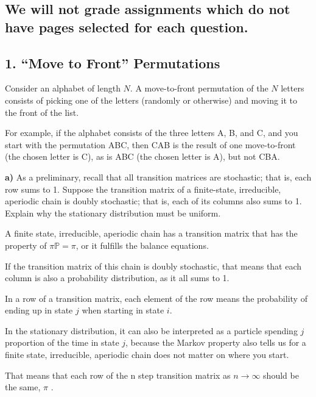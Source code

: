 \documentclass[11pt]{article}
\begin{document}
    \subsection{\texorpdfstring{\textbf{We will not grade assignments which
do not have pages selected for each
question.}}{We will not grade assignments which do not have pages selected for each question.}}\label{we-will-not-grade-assignments-which-do-not-have-pages-selected-for-each-question.}

    \newpage

    \subsection*{1. ``Move to Front''
Permutations}\label{move-to-front-permutations}

Consider an alphabet of length \(N\). A move-to-front permutation of the
\(N\) letters consists of picking one of the letters (randomly or
otherwise) and moving it to the front of the list.

For example, if the alphabet consists of the three letters A, B, and C,
and you start with the permutation ABC, then CAB is the result of one
move-to-front (the chosen letter is C), as is ABC (the chosen letter is
A), but not CBA.

\textbf{a)} As a preliminary, recall that all transition matrices are
stochastic; that is, each row sums to 1. Suppose the transition matrix
of a finite-state, irreducible, aperiodic chain is doubly stochastic;
that is, each of its columns also sums to 1. Explain why the stationary
distribution must be uniform.

A finite state, irreducible, aperiodic chain has a transition matrix that has the property of $ \pi \mathbb{P} = \pi $, or it fulfills the balance equations. 

If the transition matrix of this chain is doubly stochastic, that means that each column is also a probability distribution, as it all sums to 1. 

In a row of a transition matrix, each element of the row means the probability of ending up in state $ j $ when starting in state $ i $. 

In the stationary distribution, it can also be interpreted as a particle spending $ j $ proportion of the time in state $ j $, because the Markov property also tells us for a finite state, irreducible, aperiodic chain does not matter on where you start. 

That means that each row of the n step transition matrix as $ n\to \infty  $  should be the same, $ \pi $ . 
\end{document}
